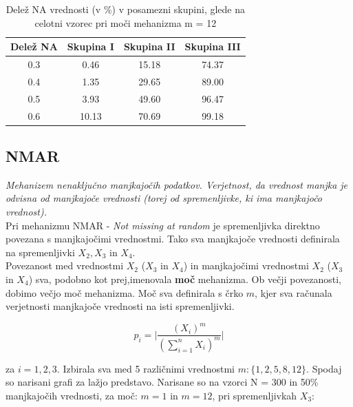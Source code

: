 \documentclass[12pt,a4paper]{article}
\begin{document}
	
\begin{table}[ht]
	\begin{tabular}{cccc}
		Delež NA & Skupina I & Skupina II  &  Skupina III  \\
		\hline
    0.3 & 0.46 & 15.18 & 74.37\\
    0.4 & 1.35 & 29.65 & 89.00\\
    0.5 & 3.93 & 49.60 & 96.47\\
    0.6 & 10.13 & 70.69 & 99.18\\
	\end{tabular}
	\caption{Delež NA vrednosti (v \%) v posamezni skupini, glede na celotni vzorec pri moči mehanizma m = 12}
	\label{tab:2}
\end{table}

\subsection{NMAR}

\textit{Mehanizem nenaključno manjkajočih podatkov. Verjetnost, da vrednost manjka je odvisna od manjkajoče vrednosti (torej od spremenljivke, ki ima manjkajočo vrednost).}
\\

\noindent Pri mehanizmu NMAR - \textit{Not missing at random} je spremenljivka direktno povezana s manjkajočimi vrednostmi. Tako sva manjkajoče vrednosti definirala na spremenljivki $X_2, X_3$ in $X_4$.
\\
\noindent Povezanost med vrednostmi $X_2$ ($X_3$ in $X_4$) in manjkajočimi vrednostmi $X_2$ ($X_3$ in $X_4$) sva, podobno kot prej,imenovala  \textbf{moč} mehanizma. Ob večji povezanosti, dobimo večjo moč mehanizma. Moč sva definirala s črko $m$, kjer sva računala verjetnosti manjkajoče vrednosti na isti spremenljivki.

$$p_i = \big| \frac{(X_i)^m}{(\sum_{i=1}^{n}X_i)^m} \big| $$

\noindent za $i = 1,2,3$.
\newpage
\noindent Izbirala sva med 5 različnimi vrednostmi $m: \{1, 2, 5, 8, 12  \}$. Spodaj so narisani grafi za lažjo predstavo. Narisane so na vzorci N = 300 in 50\% manjkajočih vrednosti, za moč: $m = 1$  in $m= 12$, pri spremenljivkah $X_3$:
\end{document}
